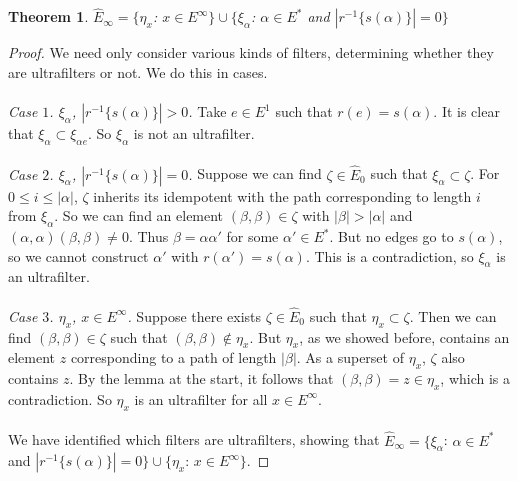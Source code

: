 \documentclass{article}
\newtheorem*{theorem}{Theorem}
\begin{document}
\begin{theorem} $\hat{E}_\infty = \{\eta_x$: $x \in E^\infty\} \cup \{\xi_\alpha$: $\alpha \in E^*$ and $|r^{-1}\{s(\alpha)\}| = 0 \}$ \end{theorem}
\begin{proof}
    We need only consider various kinds of filters, determining whether they are ultrafilters or not. We do this in cases.
    \\ \\
    \textit{Case $1$. $\xi_\alpha$, $|r^{-1}\{s(\alpha)\}| > 0$.} Take $e \in E^1$ such that $r(e) = s(\alpha)$. It is clear that
    $\xi_\alpha \subset \xi_{\alpha e}$. So $\xi_\alpha$ is not an ultrafilter.
    \\ \\
    \textit{Case $2$. $\xi_\alpha$, $|r^{-1}\{s(\alpha)\}| = 0$.} Suppose we can find $\zeta \in \hat{E}_0$ such that $\xi_\alpha \subset \zeta$.
    For $0 \leq i \leq |\alpha|$, $\zeta$ inherits its idempotent with the path corresponding to length $i$ from $\xi_\alpha$. So we can find an element $(\beta, \beta) \in \zeta$ with
    $|\beta| > |\alpha|$ and $(\alpha, \alpha)(\beta, \beta) \neq 0$. Thus $\beta = \alpha \alpha'$ for some $\alpha' \in E^*$. But no edges go to $s(\alpha)$, so we cannot
    construct $\alpha'$ with $r(\alpha') = s(\alpha)$. This is a contradiction, so $\xi_\alpha$ is an ultrafilter.
    \\ \\
    \textit{Case $3$. $\eta_x$, $x \in E^\infty$.} Suppose there exists $\zeta \in \hat{E}_0$ such that $\eta_x \subset \zeta$. Then we can find
    $(\beta, \beta) \in \zeta$ such that $(\beta, \beta) \notin \eta_x$. But $\eta_x$, as we showed before, contains an element $z$ corresponding to
    a path of length $|\beta|$. As a superset of $\eta_x$, $\zeta$ also contains $z$. By the lemma at the start, it follows that $(\beta, \beta) = z \in \eta_x$,
    which is a contradiction. So $\eta_x$ is an ultrafilter for all $x \in E^\infty$.
    \\ \\
    We have identified which filters are ultrafilters, showing that $\hat{E}_\infty = \{\xi_\alpha$: $\alpha \in E^*$ and $|r^{-1}\{s(\alpha)\}| = 0\} \cup \{\eta_x$: $x \in E^\infty\}$.
\end{proof}
\end{document}

